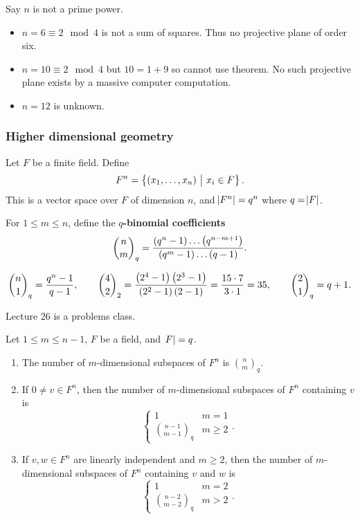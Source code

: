 \begin{example*}
Say $ n $ is not a prime power.
\begin{itemize}
\item $ n = 6 \equiv 2 \mod 4 $ is not a sum of squares. Thus no projective plane of order six.
\item $ n = 10 \equiv 2 \mod 4 $ but $ 10 = 1 + 9 $ so cannot use theorem. No such projective plane exists by a massive computer computation.
\item $ n = 12 $ is unknown.
\end{itemize}
\end{example*}

\pagebreak

\subsubsection{Higher dimensional geometry}

Let $ F $ be a finite field. Define
$$ F^n = \cbr{\br{x_1, \dots, x_n} \st x_i \in F}. $$
This is a vector space over $ F $ of dimension $ n $, and $ \abs{F^n} = q^n $ where $ q = \abs{F} $.

\begin{definition*}
For $ 1 \le m \le n $, define the \textbf{$ q $-binomial coefficients}
$$ \binom{n}{m}_q = \dfrac{\br{q^n - 1} \dots \br{q^{n - m + 1}}}{\br{q^m - 1} \dots \br{q - 1}}. $$
\end{definition*}

\begin{example*}
$$ \binom{n}{1}_q = \dfrac{q^n - 1}{q - 1}, \qquad \binom{4}{2}_2 = \dfrac{\br{2^4 - 1}\br{2^3 - 1}}{\br{2^2 - 1}\br{2 - 1}} = \dfrac{15 \cdot 7}{3 \cdot 1} = 35, \qquad \binom{2}{1}_q = q + 1. $$
\end{example*}


Lecture 26 is a problems class.


\begin{proposition}
\label{prop:3.16}
Let $ 1 \le m \le n - 1 $, $ F $ be a field, and $ \abs{F} = q $.
\begin{enumerate}
\item The number of $ m $-dimensional subspaces of $ F^n $ is $ \binom{n}{m}_q $.
\item If $ 0 \ne v \in F^n $, then the number of $ m $-dimensional subspaces of $ F^n $ containing $ v $ is
$$
\begin{cases}
1 & m = 1 \\
\binom{n - 1}{m - 1}_q & m \ge 2
\end{cases}.
$$
\item If $ v, w \in F^n $ are linearly independent and $ m \ge 2 $, then the number of $ m $-dimensional subspaces of $ F^n $ containing $ v $ and $ w $ is
$$
\begin{cases}
1 & m = 2 \\
\binom{n - 2}{m - 2}_q & m > 2
\end{cases}.
$$
\end{enumerate}
\end{proposition}

